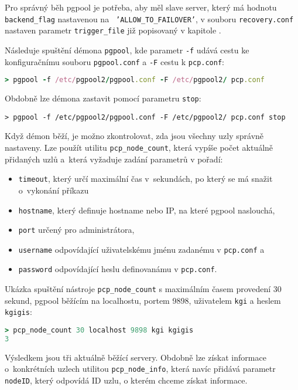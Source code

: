 Pro správný běh pgpool je potřeba, aby měl slave server, který má hodnotu
\texttt{backend\_flag} nastavenou na \texttt{ 'ALLOW\_TO\_FAILOVER'}, v
souboru \texttt{recovery.conf} nastaven parametr \texttt{trigger\_file} již
popisovaný v kapitole .

Následuje spuštění démona \texttt{pgpool}, kde parametr \texttt{-f} udává cestu
ke konfiguračnímu souboru \texttt{pgpool.conf} a \texttt{-F} cestu k
\texttt{pcp.conf}:
\begin{lstlisting}[language=ruby,keywords={stop,pgpool}]
> pgpool -f /etc/pgpool2/pgpool.conf -F /etc/pgpool2/ pcp.conf
\end{lstlisting}
Obdobně lze démona zastavit pomocí parametru \texttt{stop}:
\begin{lstlisting}[keywords={stop,pgpool}]
> pgpool -f /etc/pgpool2/pgpool.conf -F /etc/pgpool2/ pcp.conf stop
\end{lstlisting}

Když démon běží, je možno zkontrolovat, zda jsou všechny uzly správně nastaveny.
Lze použít utilitu \texttt{pcp\_node\_count}, která vypíše počet aktuálně
přidaných uzlů a~která vyžaduje zadání parametrů v pořadí:
\begin{itemize}
  \item \texttt{timeout}, který určí maximální čas v~sekundách, po který se má
    snažit o~vykonání příkazu
  \item \texttt{hostname}, který definuje hostname nebo  IP, na které pgpool
    naslouchá,
  \item \texttt{port} určený pro administrátora,
  \item \texttt{username} odpovídající uživatelskému jménu zadanému v
    \texttt{pcp.conf} a
  \item \texttt{password} odpovídající heslu definovanámu v \texttt{pcp.conf}.
\end{itemize}

Ukázka spuštění nástroje \texttt{pcp\_node\_count} s maximálním časem provedení
30 sekund, pgpool běžícím na localhostu, portem 9898, uživatelem \texttt{kgi} a heslem
\texttt{kgigis}:
\begin{lstlisting}[language=ruby,morekeywords={pcp_node_count}]
> pcp_node_count 30 localhost 9898 kgi kgigis
3
\end{lstlisting}

Výsledkem jsou tři aktuálně běžící servery. Obdobně lze získat informace
o~konkrétních uzlech utilitou \texttt{pcp\_node\_info}, která navíc přidává
parametr \texttt{nodeID}, který odpovídá ID uzlu, o kterém chceme získat
informace.

